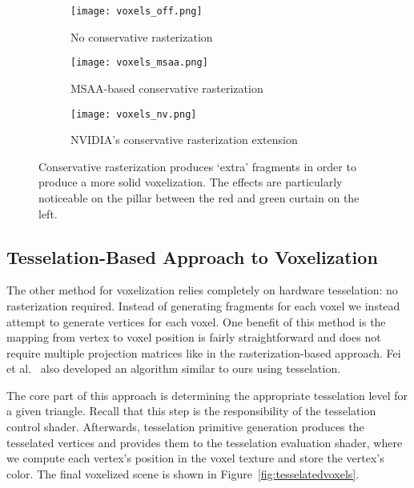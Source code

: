 

\begin{figure}[h!]
\centering
    \begin{subfigure}[t]{0.65\textwidth}
        \texttt{[image: voxels\_off.png]}
        \caption{No conservative rasterization}
    \end{subfigure}
    \begin{subfigure}[t]{0.65\textwidth}
        \texttt{[image: voxels\_msaa.png]}
        \caption{MSAA-based conservative rasterization}
    \end{subfigure}
    \begin{subfigure}[t]{0.65\textwidth}
        \texttt{[image: voxels\_nv.png]}
        \caption{NVIDIA's conservative rasterization extension}
    \end{subfigure}
    \caption{Conservative rasterization produces `extra' fragments in order to produce a more solid voxelization. The effects are particularly noticeable on the pillar between the red and green curtain on the left.}
    \label{fig:conservativerasterization}
\end{figure}

\subsection{Tesselation-Based Approach to Voxelization}
The other method for voxelization relies completely on hardware tesselation: no rasterization required. Instead of generating fragments for each voxel we instead attempt to generate vertices for each voxel. One benefit of this method is the mapping from vertex to voxel position is fairly straightforward and does not require multiple projection matrices like in the rasterization-based approach. Fei et al.~\cite{Fei:2012:PV:2305276.2305280} also developed an algorithm similar to ours using tesselation.

The core part of this approach is determining the appropriate tesselation level for a given triangle. Recall that this step is the responsibility of the tesselation control shader. Afterwards, tesselation primitive generation produces the tesselated vertices and provides them to the tesselation evaluation shader, where we compute each vertex's position in the voxel texture and store the vertex's color. The final voxelized scene is shown in Figure~\ref{fig:tesselatedvoxels}.

